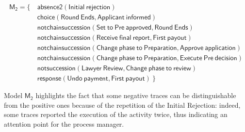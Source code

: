 \begin{align*}
\mathsf{M_2} = \{ \ &  \mathsf{ absence2(Initial\ rejection)} \\
& \mathsf{ choice(Round\ Ends, Applicant\ informed)} \\
& \mathsf{ notchainsuccession(Set\ to\ Pre\ approved, Round\ Ends)} \\
& \mathsf{ notchainsuccession(Receive\ final\ report, First\ payout)} \\
& \mathsf{ notchainsuccession(Change\ phase\ to\ Preparation, Approve\ application)} \\
& \mathsf{ notchainsuccession(Change\ phase\ to\ Preparation, Execute\ Pre\ decision)} \\
& \mathsf{ notsuccession(Lawyer\ Review, Change\ phase\ to\ review)} \\
& \mathsf{ response(Undo\ payment, First\ payout) } \ \} 
\end{align*}

Model $\mathsf{M_2}$ highlights the fact that some negative traces can be distinguishable from the positive ones because of the repetition of the \textsf{Initial Rejection}: indeed, some traces reported the execution of the activity twice, thus indicating an attention point for the process manager.



